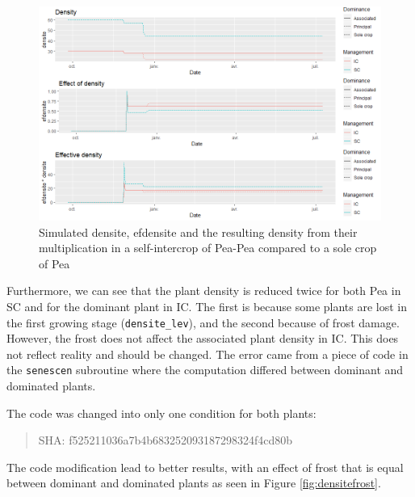 \documentclass[]{book}
\begin{document}
\begin{figure}
\centering
\includegraphics{img/density_effect.png}
\caption{\label{fig:densiteef}Simulated densite, efdensite and the resulting density from their multiplication in a self-intercrop of Pea-Pea compared to a sole crop of Pea}
\end{figure}

Furthermore, we can see that the plant density is reduced twice for both Pea in SC and for the dominant plant in IC. The first is because some plants are lost in the first growing stage (\texttt{densite\_lev}), and the second because of frost damage. However, the frost does not affect the associated plant density in IC. This does not reflect reality and should be changed.
The error came from a piece of code in the \texttt{senescen} subroutine where the computation differed between dominant and dominated plants.

The code was changed into only one condition for both plants:

\begin{quote}
SHA: f525211036a7b4b683252093187298324f4cd80b
\end{quote}

The code modification lead to better results, with an effect of frost that is equal between dominant and dominated plants as seen in Figure \ref{fig:densitefrost}.
\end{document}
